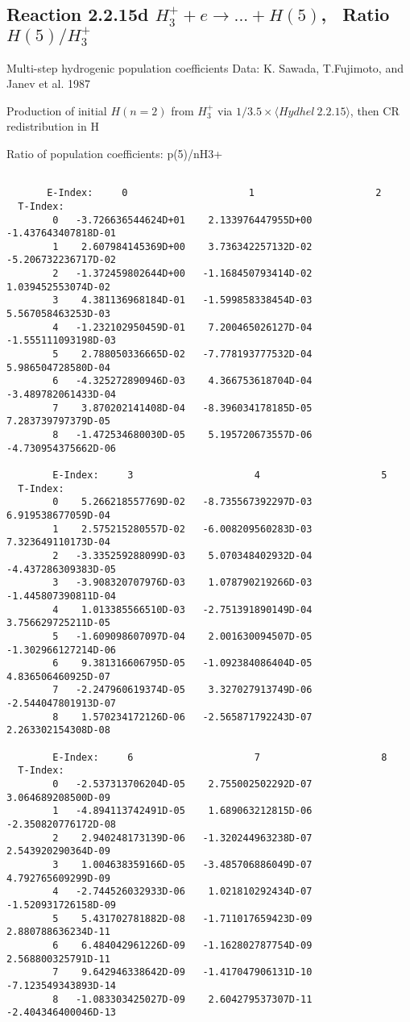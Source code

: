 \documentclass[12pt,dvipdfmx]{article}
\begin{document}
\subsection{
Reaction 2.2.15d $ H_3^+ + e \rightarrow ...+ H(5) $, \   Ratio $H(5)/H_3^+  $
}

 Multi-step hydrogenic population coefficients
 Data: K. Sawada, T.Fujimoto, \cite{kn:Sawada} and Janev et al. 1987

 Production of initial $H(n=2)$ from $H_3^+$ via $1/3.5 \times \langle Hydhel~ 2.2.15\rangle$,
 then CR redistribution in H

 Ratio of population coefficients: p(5)/nH3+

\begin{small}\begin{verbatim}

       E-Index:     0                     1                     2
  T-Index:
        0   -3.726636544624D+01    2.133976447955D+00   -1.437643407818D-01
        1    2.607984145369D+00    3.736342257132D-02   -5.206732236717D-02
        2   -1.372459802644D+00   -1.168450793414D-02    1.039452553074D-02
        3    4.381136968184D-01   -1.599858338454D-03    5.567058463253D-03
        4   -1.232102950459D-01    7.200465026127D-04   -1.555111093198D-03
        5    2.788050336665D-02   -7.778193777532D-04    5.986504728580D-04
        6   -4.325272890946D-03    4.366753618704D-04   -3.489782061433D-04
        7    3.870202141408D-04   -8.396034178185D-05    7.283739797379D-05
        8   -1.472534680030D-05    5.195720673557D-06   -4.730954375662D-06

        E-Index:     3                     4                     5
  T-Index:
        0    5.266218557769D-02   -8.735567392297D-03    6.919538677059D-04
        1    2.575215280557D-02   -6.008209560283D-03    7.323649110173D-04
        2   -3.335259288099D-03    5.070348402932D-04   -4.437286309383D-05
        3   -3.908320707976D-03    1.078790219266D-03   -1.445807390811D-04
        4    1.013385566510D-03   -2.751391890149D-04    3.756629725211D-05
        5   -1.609098607097D-04    2.001630094507D-05   -1.302966127214D-06
        6    9.381316606795D-05   -1.092384086404D-05    4.836506460925D-07
        7   -2.247960619374D-05    3.327027913749D-06   -2.544047801913D-07
        8    1.570234172126D-06   -2.565871792243D-07    2.263302154308D-08

        E-Index:     6                     7                     8
  T-Index:
        0   -2.537313706204D-05    2.755002502292D-07    3.064689208500D-09
        1   -4.894113742491D-05    1.689063212815D-06   -2.350820776172D-08
        2    2.940248173139D-06   -1.320244963238D-07    2.543920290364D-09
        3    1.004638359166D-05   -3.485706886049D-07    4.792765609299D-09
        4   -2.744526032933D-06    1.021810292434D-07   -1.520931726158D-09
        5    5.431702781882D-08   -1.711017659423D-09    2.880788636234D-11
        6    6.484042961226D-09   -1.162802787754D-09    2.568800325791D-11
        7    9.642946338642D-09   -1.417047906131D-10   -7.123549343893D-14
        8   -1.083303425027D-09    2.604279537307D-11   -2.404346400046D-13


\end{verbatim}
\end{small}
\end{document}
